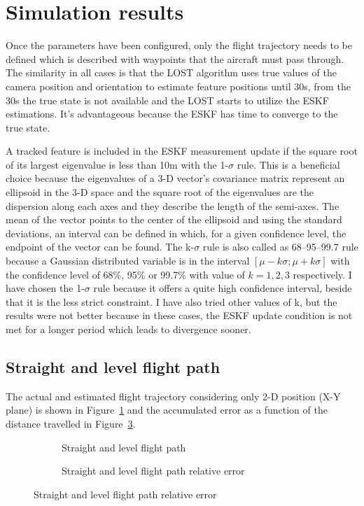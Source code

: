 \section{Simulation results}

Once the parameters have been configured, only the flight trajectory needs to be defined which is described with waypoints that the aircraft must pass through. The similarity in all cases is that the LOST algorithm uses true values of the camera position and orientation to estimate feature positions until 30\si{\second}, from the 30\si{\second} the true state is not available and the LOST starts to utilize the ESKF estimations. It's advantageous because the ESKF has time to converge to the true state.

A tracked feature is included in the ESKF measurement update if the square root of its largest eigenvalue is less than 10\si{\meter} with the 1-$\sigma$ rule. This is a beneficial choice because the eigenvalues of a 3-D vector's covariance matrix represent an ellipsoid in the 3-D space and the square root of the eigenvalues are the dispersion along each axes and they describe the length of the semi-axes. The mean of the vector points to the center of the ellipsoid and using the standard deviations, an interval can be defined in which, for a given confidence level, the endpoint of the vector can be found. The k-$\sigma$ rule is also called as 68--95--99.7 rule because a Gaussian distributed variable is in the interval $[\mu-k\sigma;\mu+k\sigma]$ with the confidence level of 68\%, 95\% or 99.7\% with value of $k=1, 2, 3$ respectively. I have chosen the 1-$\sigma$ rule because it offers a quite high confidence interval, beside that it is the less strict constraint. I have also tried other values of k, but the results were not better because in these cases, the ESKF update condition is not met for a longer period which leads to divergence sooner.

\subsection{Straight and level flight path}

The actual and estimated flight trajectory considering only 2-D position (X-Y plane) is shown in Figure~\ref{fig:straight-level} and the accumulated error as a function of the distance travelled in Figure~\ref{fig:straight-level-error}.

\begin{figure}[H]
    \centering
    \begin{subfigure}{0.45\textwidth}
        
        \caption{Straight and level flight path}\label{fig:straight-level}
    \end{subfigure}
    \begin{subfigure}{0.45\textwidth}
        
        \caption{Straight and level flight path relative error}\label{fig:straight-level-error}
    \end{subfigure}
\end{figure}

